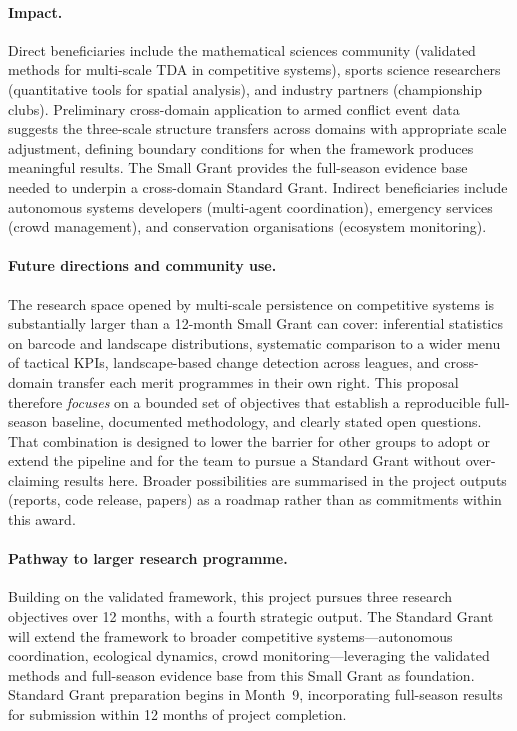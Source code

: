 \paragraph{Impact.}
Direct beneficiaries include the mathematical sciences community (validated methods for multi-scale TDA in competitive systems), sports science researchers (quantitative tools for spatial analysis), and industry partners (championship clubs). Preliminary cross-domain application to armed conflict event data \citep{Brown2026inprep} suggests the three-scale structure transfers across domains with appropriate scale adjustment, defining boundary conditions for when the framework produces meaningful results. The Small Grant provides the full-season evidence base needed to underpin a cross-domain Standard Grant. Indirect beneficiaries include autonomous systems developers (multi-agent coordination), emergency services (crowd management), and conservation organisations (ecosystem monitoring).

\paragraph{Future directions and community use.}
The research space opened by multi-scale persistence on competitive systems is substantially larger than a 12-month Small Grant can cover: inferential statistics on barcode and landscape distributions, systematic comparison to a wider menu of tactical KPIs, landscape-based change detection across leagues, and cross-domain transfer each merit programmes in their own right. This proposal therefore \emph{focuses} on a bounded set of objectives that establish a reproducible full-season baseline, documented methodology, and clearly stated open questions. That combination is designed to lower the barrier for other groups to adopt or extend the pipeline and for the team to pursue a Standard Grant without over-claiming results here. Broader possibilities are summarised in the project outputs (reports, code release, papers) as a roadmap rather than as commitments within this award.

\paragraph{Pathway to larger research programme.}
Building on the validated framework, this project pursues three research objectives over 12 months, with a fourth strategic output. The Standard Grant will extend the framework to broader competitive systems---autonomous coordination, ecological dynamics, crowd monitoring---leveraging the validated methods and full-season evidence base from this Small Grant as foundation. Standard Grant preparation begins in Month~9, incorporating full-season results for submission within 12 months of project completion.

